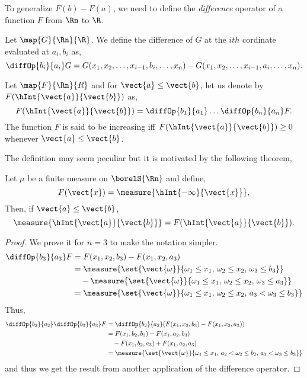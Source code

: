 To generalize $F(b) - F(a)$, we need to define the \emph{difference} operator of a function $F$ from
$\Rn$ to $\R$.
\begin{Definition}[name=Difference Operator]
    Let $\map{G}{\Rn}{\R}$. We define the difference of $G$ at the $ith$ cordinate evaluated at
    $a_i,b_i$ as,
    \[\diffOp{b_i}{a_i}G = G(x_1,x_2,\dots,x_{i-1},b_i,\dots,x_n) - 
	G(x_1,x_2,\dots,x_{i-1},a_i,\dots,x_n). \]
\end{Definition}
\begin{Definition}[name=Increasing Function in $\Rn$]
    Let $\map{F}{\Rn}{R}$ and for $\vect{a} \leq \vect{b}$, let us denote by
    $F(\hInt{\vect{a}}{\vect{b}})$ as,
    \[F(\hInt{\vect{a}}{\vect{b}}) = \diffOp{b_1}{a_1}\dots\diffOp{b_n}{a_n}F.\]
    The function $F$ is said to be increasing iff $F(\hInt{\vect{a}}{\vect{b}}) \geq 0$ whenever
    $\vect{a} \leq \vect{b}$.
\end{Definition}
The definition may seem peculiar but it is motivated by the following theorem,
\begin{Theorem}[name=Measure and Distribution function in $\Rn$]
    Let $\mu$ be a finite measure on $\borelS{\Rn}$ and define,
    \[F(\vect{x}) = \measure{\hInt{-\infty}{\vect{x}}},\]
    Then, if $\vect{a} \leq \vect{b}$, 
    \[\measure{\hInt{\vect{a}}{\vect{b}}} = F(\hInt{\vect{a}}{\vect{b}}).\]
\end{Theorem}
\begin{proof}
    We prove it for $n=3$ to make the notation simpler. 
    \begin{align*}
	\diffOp{b_3}{a_3}F &= F(x_1,x_2,b_3) - F(x_1,x_2,a_3) \\
	&= \measure{\set{\vect{\omega}}{\omega_{1}\leq x_1,\,\omega_2\leq x_2,\,\omega_3\leq b_3}}
	\\ 
	&\quad	- \measure{\set{\vect{\omega}}{\omega_{1}\leq x_1,\,\omega_2\leq x_2,\,\omega_3\leq
		a_3}} \\
	&= \measure{\set{\vect{\omega}}{\omega_{1}\leq x_1,\,\omega_2\leq x_2,\,a_3 < \omega_3\leq
		b_3}}
    \end{align*}
    Thus,
    \begin{align*}
	\diffOp{b_2}{a_2}\diffOp{b_3}{a_3}F &=\diffOp{b_2}{a_2}(F(x_1,x_2,b_3) - F(x_1,x_2,a_3)) \\
	&= F(x_1,b_2,b_3) - F(x_1,a_2,b_3) \\
	&\quad -F(x_1,b_2,a_3) + F(x_1,a_2,a_3)\\
	&= \measure{\set{\vect{\omega}}{\omega_1\leq x_1,\,a_2 < \omega_2 \leq b_2,\, a_3 < \omega_3
	    \leq b_3}}
    \end{align*}
    and thus we get the result from another application of the difference operator.
\end{proof}
